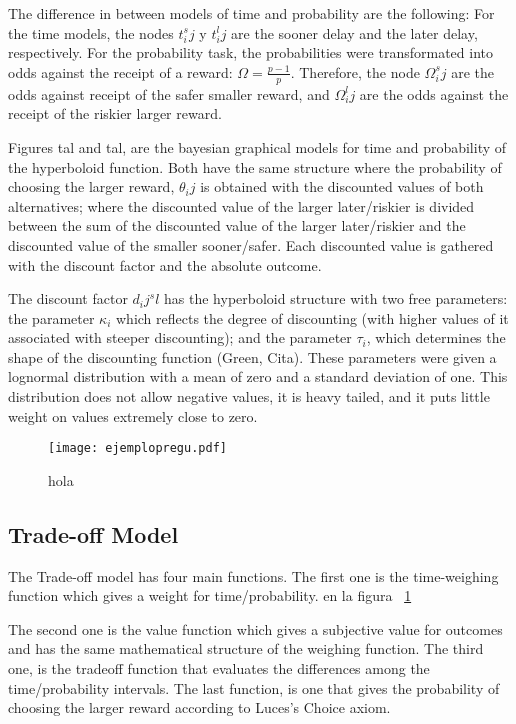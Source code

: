 \documentclass[jou,apacite]{apa6}
\begin{document}
The difference in between models of time and probability are the following: For the time models, the nodes $t^s_ij$ y $t^l_ij$ are the sooner delay and the later delay, respectively. For the probability task, the probabilities were transformated into odds against the receipt of a reward: $\Omega = \frac{p-1}{p}$. Therefore, the node $\Omega^s_ij$ are the odds against receipt of the safer smaller reward, and $\Omega^l_ij$ are the odds against the receipt of the riskier larger reward. 

Figures tal and tal, are the bayesian graphical models for time and probability of the hyperboloid function. Both have the same structure where the probability of choosing the larger reward, $\theta_ij$ is obtained with the discounted values of both alternatives; where the discounted value of the larger later/riskier is divided between the sum of the discounted value of the larger later/riskier and the discounted value of the smaller sooner/safer. Each discounted value is gathered with the discount factor and the absolute outcome. 

The discount factor $d_ij^sl$ has the hyperboloid structure with two free parameters: the parameter $\kappa_i$ which reflects the degree of discounting (with higher values of it associated with steeper discounting); and the parameter $\tau_i$, which determines the shape of the discounting function (Green, Cita). These parameters were given a lognormal distribution with a mean of zero and a standard deviation of one. This distribution does not allow negative values, it is heavy tailed, and it puts little weight on values extremely close to zero. 

\begin{figure}[!ht]
\centering
\texttt{[image: ejemplopregu.pdf]}
\caption{hola}
\label{fig:hiperpro}
\end{figure}

\subsection{Trade-off Model}

The Trade-off model has four main functions. The first one is the time-weighing function which gives a weight for time/probability. en la figura ~\ref{fig:hiperpro}

The second one is the value function which gives a subjective value for outcomes and has the same mathematical structure of the weighing function. The third one, is the tradeoff function that evaluates the differences among the time/probability intervals. The last function, is one that gives the probability of choosing the larger reward according to Luces's Choice axiom. %
\end{document}
